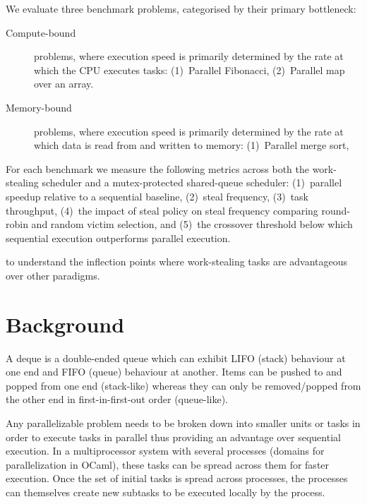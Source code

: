 \documentclass[11pt,a4paper]{article}
\begin{document}
\begin{enumerate}
    We evaluate three benchmark problems, categorised by their primary bottleneck:

    \begin{description}
      \item[Compute-bound] problems, where execution speed is primarily
      determined by the rate at which the CPU executes tasks:
      (1)~Parallel Fibonacci,
      (2)~Parallel map over an array.

      \item[Memory-bound] problems, where execution speed is primarily
      determined by the rate at which data is read from and written to memory:
      (1)~Parallel merge sort,
     \end{description}

     For each benchmark we measure the following metrics across both the
     work-stealing scheduler and a mutex-protected shared-queue scheduler:
     (1)~parallel speedup relative to a sequential baseline,
     (2)~steal frequency,
     (3)~task throughput,
     (4)~the impact of steal policy on steal frequency comparing round-robin
     and random victim selection, and
     (5)~the crossover threshold below which sequential execution outperforms
     parallel execution.

     to understand the inflection points where work-stealing tasks are
     advantageous over other paradigms.

\end{enumerate}

\section{Background}
\label{sec:background}

A deque is a double-ended queue which can exhibit LIFO (stack)
behaviour at one end and FIFO (queue) behaviour at another. Items can be pushed
to and popped from one end (stack-like) whereas they can only be removed/popped
from the other end in first-in-first-out order (queue-like).

Any parallelizable problem needs to be broken down into smaller units or tasks
in order to execute tasks in parallel thus providing an advantage over
sequential execution. In a multiprocessor system with several processes
(domains for parallelization in OCaml), these tasks can be spread across them
for faster execution. Once the set of initial tasks is spread across processes,
the processes can themselves create new subtasks to be executed locally by the
process.
\end{document}

